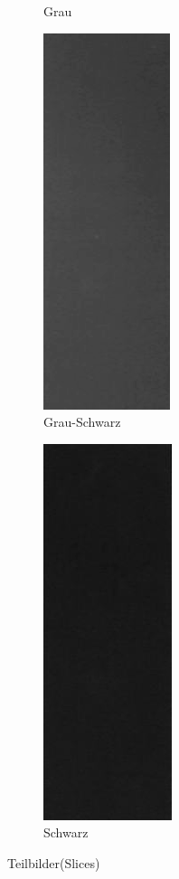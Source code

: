 \documentclass[12pt, oneside, a4paper, \docLanguage]{report}
\begin{document}
\begin{figure}[H]
\begin{subfigure}{.35\textwidth}
  \caption{Grau}
  \label{fig:sub3}
\end{subfigure}
\begin{subfigure}{.35\textwidth}
  \centering
  \includegraphics[width=.35\linewidth]{../greyBlackSlice.png}
  \caption{Grau-Schwarz}
  \label{fig:sub4}
\end{subfigure}
\begin{subfigure}{.3\textwidth}
  \centering
  \includegraphics[width=.35\linewidth]{../blackSlice.png}
  \caption{Schwarz}
  \label{fig:sub5}
\end{subfigure}
\caption{Teilbilder(Slices)}
\label{fig:Teilbilder}
\end{figure}
\end{document}
